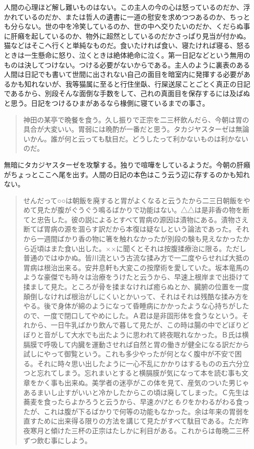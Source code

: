 \documentclass[12pt, openright]{book}
\begin{document}
人間の心理ほど解し難いものはない。この主人の今の心は怒っているのだか、浮かれているのだか、または哲人の遺書に一道の慰安を求めつつあるのか、ちっとも分らない。世の中を冷笑しているのか、世の中へ交りたいのだか、くだらぬ事に肝癪を起しているのか、物外に超然としているのだかさっぱり見当が付かぬ。猫などはそこへ行くと単純なものだ。食いたければ食い、寝たければ寝る、怒るときは一生懸命に怒り、泣くときは絶体絶命に泣く。第一日記などという無用のものは決してつけない。つける必要がないからである。主人のように裏表のある人間は日記でも書いて世間に出されない自己の面目を暗室内に発揮する必要があるかも知れないが、我等猫属に至ると行住坐臥、行屎送尿ことごとく真正の日記であるから、別段そんな面倒な手数をして、己れの真面目を保存するには及ばぬと思う。日記をつけるひまがあるなら椽側に寝ているまでの事さ。

\blockquote{神田の某亭で晩餐を食う。久し振りで正宗を二三杯飲んだら、今朝は胃の具合が大変いい。胃弱には晩酌が一番だと思う。タカジヤスターゼは無論いかん。誰が何と云っても駄目だ。どうしたって利かないものは利かないのだ。}

無暗にタカジヤスターゼを攻撃する。独りで喧嘩をしているようだ。今朝の肝癪がちょっとここへ尾を出す。人間の日記の本色はこう云う辺に存するのかも知れない。

\blockquote{せんだって○○は朝飯を廃すると胃がよくなると云うたから二三日朝飯をやめて見たが腹がぐうぐう鳴るばかりで功能はない。△△は是非香の物を断てと忠告した。彼の説によるとすべて胃病の源因は漬物にある。漬物さえ断てば胃病の源を涸らす訳だから本復は疑なしという論法であった。それから一週間ばかり香の物に箸を触れなかったが別段の験も見えなかったから近頃はまた食い出した。××に聞くとそれは按腹揉療治に限る。ただし普通のではゆかぬ。皆川流という古流な揉み方で一二度やらせれば大抵の胃病は根治出来る。安井息軒も大変この按摩術を愛していた。坂本竜馬のような豪傑でも時々は治療をうけたと云うから、早速上根岸まで出掛けて揉まして見た。ところが骨を揉まなければ癒らぬとか、臓腑の位置を一度顛倒しなければ根治がしにくいとかいって、それはそれは残酷な揉み方をやる。後で身体が綿のようになって昏睡病にかかったような心持ちがしたので、一度で閉口してやめにした。Ａ君は是非固形体を食うなという。それから、一日牛乳ばかり飲んで暮して見たが、この時は腸の中でどぼりどぼりと音がして大水でも出たように思われて終夜眠れなかった。Ｂ氏は横膈膜で呼吸して内臓を運動させれば自然と胃の働きが健全になる訳だから試しにやって御覧という。これも多少やったが何となく腹中が不安で困る。それに時々思い出したように一心不乱にかかりはするものの五六分立つと忘れてしまう。忘れまいとすると横膈膜が気になって本を読む事も文章をかく事も出来ぬ。美学者の迷亭がこの体を見て、産気のついた男じゃあるまいし止すがいいと冷かしたからこの頃は廃してしまった。Ｃ先生は蕎麦を食ったらよかろうと云うから、早速\emph{かけ}と\emph{もり}をかわるがわる食ったが、これは腹が下るばかりで何等の功能もなかった。余は年来の胃弱を直すために出来得る限りの方法を講じて見たがすべて駄目である。ただ昨夜寒月と傾けた三杯の正宗はたしかに利目がある。これからは毎晩二三杯ずつ飲む事にしよう。}
\end{document}
